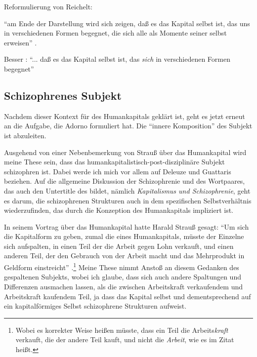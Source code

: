 \documentclass[12pt,
               DIV13,
               paper=a4,
               twoside=false,
               onehalfspacing,
               bibliography=totoc,
               toc=graduated,
               draft,
               ]{scrartcl}
\newcommand{\pc}[2]{\parencite[#1]{#2}}
\newcommand{\worries}[1]{\ifdraft{\textcolor{blue}{\texttt{(#1)}}}{}}
\begin{document}
Reformulierung von Reichelt:

"`am Ende der Darstellung wird sich zeigen, daß es das Kapital selbst
ist, das uns in verschiedenen Formen begegnet, die sich alle als
Momente seiner selbst erweisen"' \pc{181}{reichelt}.

Besser \worries{?}: "`... daß es das Kapital selbst ist, das
\emph{sich} in verschiedenen Formen begegnet"'



\subsection{Schizophrenes Subjekt}

Nachdem dieser Kontext für des Humankapitals geklärt ist, geht es
jetzt erneut an die Aufgabe, die Adorno formuliert hat. Die "`innere
Komposition"' \pc{261}{min} des Subjekt ist abzuleiten.

Ausgehend von einer Nebenbemerkung von Strauß über das Humankapital
wird meine These sein, dass das humankapitalistisch-post-disziplinäre
Subjekt schizophren ist. Dabei werde ich mich vor allem auf Deleuze
und Guattaris  beziehen. Auf die allgemeine Diskussion
der Schizophrenie und des Wortpaares, das auch den Untertitle des
 bildet, nämlich \emph{Kapitalismus und Schizophrenie},
geht es darum, die schizophrenen Strukturen auch in dem spezifischen
Selbstverhältnis wiederzufinden, das durch die Konzeption des
Humankapitals impliziert ist.

In seinem Vortrag über das Humankapital hatte Harald Strauß gesagt:
"`Um sich die Kapitalform zu geben, zumal die eines Humankapitals,
müsste der Einzelne sich aufspalten, in einen Teil der die Arbeit
gegen Lohn verkauft, und einen anderen Teil, der den Gebrauch von der
Arbeit macht und das Mehrprodukt in Geldform einstreicht"' \pc{S.
126}{strauss}.\footnote{Wobei es korrekter Weise heißen müsste, dass
ein Teil die Arbeits\emph{kraft} verkauft, die der andere Teil kauft,
und nicht die \emph{Arbeit}, wie es im Zitat heißt.} Meine These nimmt
Anstoß an diesem Gedanken des gespaltenen Subjekts, wobei ich glaube,
dass sich auch andere Spaltungen und Differenzen ausmachen lassen, als
die zwischen Arbeitskraft verkaufendem und Arbeitskraft kaufendem
Teil, ja dass das Kapital selbst und dementsprechend auf ein
kapitalförmiges Selbst schizophrene Strukturen aufweist.

\end{document}
